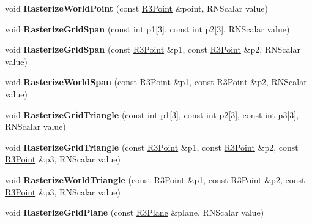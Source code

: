 \begin{DoxyCompactItemize}
\item 
void {\bfseries Rasterize\+World\+Point} (const \hyperlink{class_r3_point}{R3\+Point} \&point, R\+N\+Scalar value)\hypertarget{class_r3_grid_a765db3789cc690a2ccb797b3c5330d9f}{}\label{class_r3_grid_a765db3789cc690a2ccb797b3c5330d9f}

\item 
void {\bfseries Rasterize\+Grid\+Span} (const int p1\mbox{[}3\mbox{]}, const int p2\mbox{[}3\mbox{]}, R\+N\+Scalar value)\hypertarget{class_r3_grid_ae0baa983476e49452e8dd124b1b76742}{}\label{class_r3_grid_ae0baa983476e49452e8dd124b1b76742}

\item 
void {\bfseries Rasterize\+Grid\+Span} (const \hyperlink{class_r3_point}{R3\+Point} \&p1, const \hyperlink{class_r3_point}{R3\+Point} \&p2, R\+N\+Scalar value)\hypertarget{class_r3_grid_ae3bc3bcd92d2f116828306615dfdd138}{}\label{class_r3_grid_ae3bc3bcd92d2f116828306615dfdd138}

\item 
void {\bfseries Rasterize\+World\+Span} (const \hyperlink{class_r3_point}{R3\+Point} \&p1, const \hyperlink{class_r3_point}{R3\+Point} \&p2, R\+N\+Scalar value)\hypertarget{class_r3_grid_a46215fc55cd06d557a6c8dc324cb18fd}{}\label{class_r3_grid_a46215fc55cd06d557a6c8dc324cb18fd}

\item 
void {\bfseries Rasterize\+Grid\+Triangle} (const int p1\mbox{[}3\mbox{]}, const int p2\mbox{[}3\mbox{]}, const int p3\mbox{[}3\mbox{]}, R\+N\+Scalar value)\hypertarget{class_r3_grid_a9cc3ba427d103c9fe6676380bbff5069}{}\label{class_r3_grid_a9cc3ba427d103c9fe6676380bbff5069}

\item 
void {\bfseries Rasterize\+Grid\+Triangle} (const \hyperlink{class_r3_point}{R3\+Point} \&p1, const \hyperlink{class_r3_point}{R3\+Point} \&p2, const \hyperlink{class_r3_point}{R3\+Point} \&p3, R\+N\+Scalar value)\hypertarget{class_r3_grid_ab36b7dc4b9aef9d8972c887a80e3085b}{}\label{class_r3_grid_ab36b7dc4b9aef9d8972c887a80e3085b}

\item 
void {\bfseries Rasterize\+World\+Triangle} (const \hyperlink{class_r3_point}{R3\+Point} \&p1, const \hyperlink{class_r3_point}{R3\+Point} \&p2, const \hyperlink{class_r3_point}{R3\+Point} \&p3, R\+N\+Scalar value)\hypertarget{class_r3_grid_a6913fbd1001b4dbfd56459e67c4eb782}{}\label{class_r3_grid_a6913fbd1001b4dbfd56459e67c4eb782}

\item 
void {\bfseries Rasterize\+Grid\+Plane} (const \hyperlink{class_r3_plane}{R3\+Plane} \&plane, R\+N\+Scalar value)\hypertarget{class_r3_grid_a3fbbd6f2296377d5935fdb5fe52e70ae}{}\label{class_r3_grid_a3fbbd6f2296377d5935fdb5fe52e70ae}


\end{DoxyCompactItemize}
